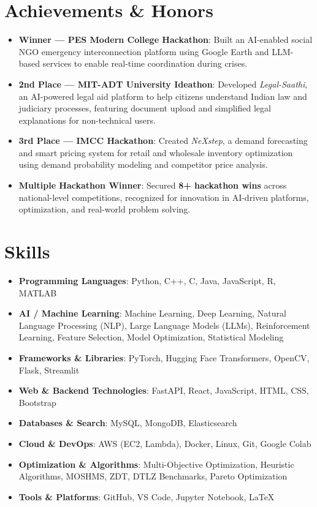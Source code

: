 \documentclass[letterpaper,11pt]{article}
\newcommand{\resumeItem}[2]{
  \item\small{
    \textbf{#1}{: #2 \vspace{-2pt}}
  }
}
\newcommand{\resumeSubItem}[2]{\resumeItem{#1}{#2}\vspace{-4pt}}
\newcommand{\resumeSubHeadingListStart}{\begin{itemize}[leftmargin=*,label={}]}
\newcommand{\resumeSubHeadingListStartBullets}{\begin{itemize}[leftmargin=*]}
\newcommand{\resumeSubHeadingListEnd}{\end{itemize}}
\begin{document}
  
\section{Achievements \& Honors}
  \resumeSubHeadingListStartBullets

    \resumeSubItem{Winner --- PES Modern College Hackathon}
      {Built an AI-enabled social NGO emergency interconnection platform using Google Earth and LLM-based services to enable real-time coordination during crises.}

    \resumeSubItem{2nd Place --- MIT-ADT University Ideathon}
      {Developed \textit{Legal-Saathi}, an AI-powered legal aid platform to help citizens understand Indian law and judiciary processes, featuring document upload and simplified legal explanations for non-technical users.}

    \resumeSubItem{3rd Place --- IMCC Hackathon}
      {Created \textit{NeXstep}, a demand forecasting and smart pricing system for retail and wholesale inventory optimization using demand probability modeling and competitor price analysis.}

    \resumeSubItem{Multiple Hackathon Winner}
      {Secured \textbf{8+ hackathon wins} across national-level competitions, recognized for innovation in AI-driven platforms, optimization, and real-world problem solving.}

  \resumeSubHeadingListEnd


\section{Skills}
  \resumeSubHeadingListStart
    \resumeSubItem{Programming Languages}
      {Python, C++, C, Java, JavaScript, R, MATLAB}

    \resumeSubItem{AI / Machine Learning}
      {Machine Learning, Deep Learning, Natural Language Processing (NLP), Large Language Models (LLMs), Reinforcement Learning, Feature Selection, Model Optimization, Statistical Modeling}

    \resumeSubItem{Frameworks \& Libraries}
      {PyTorch, Hugging Face Transformers, OpenCV, Flask, Streamlit}

    \resumeSubItem{Web \& Backend Technologies}
      {FastAPI, React, JavaScript, HTML, CSS, Bootstrap}

    \resumeSubItem{Databases \& Search}
      {MySQL, MongoDB, Elasticsearch}

    \resumeSubItem{Cloud \& DevOps}
      {AWS (EC2, Lambda), Docker, Linux, Git, Google Colab}

    \resumeSubItem{Optimization \& Algorithms}
      {Multi-Objective Optimization, Heuristic Algorithms, MOSHMS, ZDT, DTLZ Benchmarks, Pareto Optimization}

    \resumeSubItem{Tools \& Platforms}
      {GitHub, VS Code, Jupyter Notebook, LaTeX}

  \resumeSubHeadingListEnd



\end{document}
